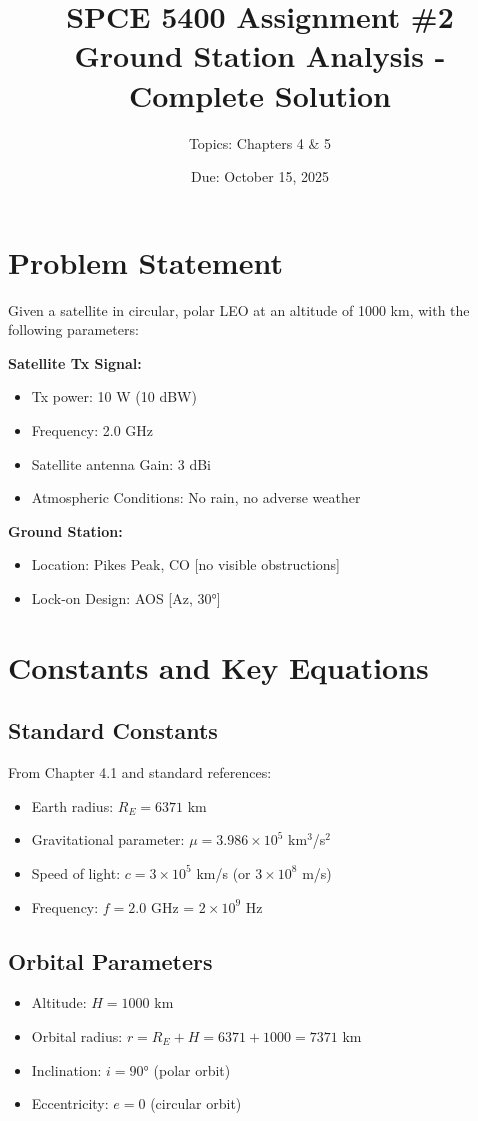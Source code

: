 \documentclass[11pt,letterpaper]{article}
\title{\textbf{SPCE 5400 Assignment \#2} \\ Ground Station Analysis - Complete Solution}
\author{Topics: Chapters 4 \& 5}
\date{Due: October 15, 2025}
\begin{document}
\maketitle

\section{Problem Statement}

Given a satellite in circular, polar LEO at an altitude of 1000 km, with the following parameters:

\textbf{Satellite Tx Signal:}
\begin{itemize}
    \item Tx power: 10 W (10 dBW)
    \item Frequency: 2.0 GHz
    \item Satellite antenna Gain: 3 dBi
    \item Atmospheric Conditions: No rain, no adverse weather
\end{itemize}

\textbf{Ground Station:}
\begin{itemize}
    \item Location: Pikes Peak, CO [no visible obstructions]
    \item Lock-on Design: AOS [Az, 30°]
\end{itemize}

\section{Constants and Key Equations}

\subsection{Standard Constants}
From Chapter 4.1 and standard references:
\begin{itemize}
    \item Earth radius: $R_E = 6371$ km
    \item Gravitational parameter: $\mu = 3.986 \times 10^5$ km$^3$/s$^2$
    \item Speed of light: $c = 3 \times 10^5$ km/s (or $3 \times 10^8$ m/s)
    \item Frequency: $f = 2.0$ GHz = $2 \times 10^9$ Hz
\end{itemize}

\subsection{Orbital Parameters}
\begin{itemize}
    \item Altitude: $H = 1000$ km
    \item Orbital radius: $r = R_E + H = 6371 + 1000 = 7371$ km
    \item Inclination: $i = 90°$ (polar orbit)
    \item Eccentricity: $e = 0$ (circular orbit)
\end{itemize}
\end{document}
